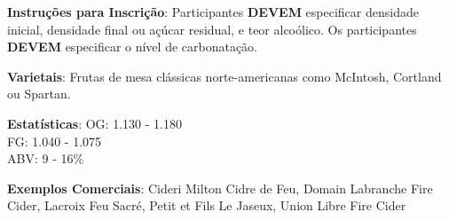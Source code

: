 \textbf{Instruções para Inscrição}: Participantes \textbf{DEVEM} especificar densidade inicial, densidade final ou açúcar residual, e teor alcoólico. Os participantes \textbf{DEVEM} especificar o nível de carbonatação.

\textbf{Varietais}: Frutas de mesa clássicas norte-americanas como McIntosh, Cortland ou Spartan.

\textbf{Estatísticas}: OG: 1.130 - 1.180 \\
\phantom{ } \hspace{16.5mm} FG: 1.040 - 1.075 \\
\phantom{ } \hspace{16.5mm} ABV: 9 - 16\%

\textbf{Exemplos Comerciais}: Cideri Milton Cidre de Feu, Domain Labranche Fire Cider, Lacroix Feu Sacré, Petit et Fils Le Jaseux, Union Libre Fire Cider

